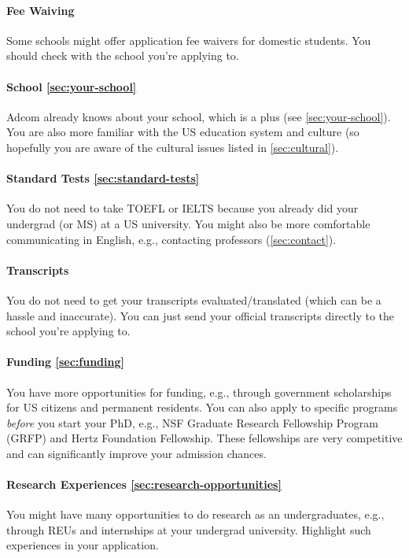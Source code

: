 \documentclass[oneside,11pt,dvipsnames]{book}
\begin{document}
\paragraph{Fee Waiving} Some schools might offer application fee waivers for domestic students.  You should check with the school you're applying to.

\paragraph{School \autoref{sec:your-school}} Adcom already knows about your school, which is a plus (see \autoref{sec:your-school}). You are also more familiar with the US education system and culture (so hopefully you are aware of the cultural issues listed in \autoref{sec:cultural}).

\paragraph{Standard Tests \autoref{sec:standard-tests}} You do not need to take TOEFL or IELTS because you already did your undergrad (or MS) at a US university.  You might also be more comfortable communicating in English, e.g., contacting professors (\autoref{sec:contact}).

\paragraph{Transcripts} You do not need to get your transcripts evaluated/translated (which can be a hassle and inaccurate).  You can just send your official transcripts directly to the school you're applying to.

\paragraph{Funding \autoref{sec:funding}} You have more opportunities for funding, e.g., through government scholarships for US citizens and permanent residents.  You can also apply to specific programs \emph{before} you start your PhD, e.g., NSF Graduate Research Fellowship Program (GRFP) and Hertz Foundation Fellowship.  These fellowships are very competitive and can significantly improve your admission chances.

\paragraph{Research Experiences \autoref{sec:research-opportunities}} You might have many opportunities to do research as an undergraduates, e.g., through REUs and internships at your undergrad university.  Highlight such experiences in your application.
\end{document}
